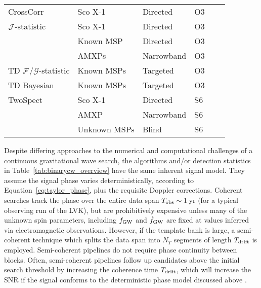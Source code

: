 \begin{table}
{\begin{NiceTabular}{l p{2cm} l p{2cm} p{2.2cm} p{2.2cm}}
    CrossCorr       & Sco X-1 & Directed & O3 & \citep{Dhurandhar2008,Whelan2015} & \citep{o3crosscorSco,Whelan2023}\\
    $\mathcal{J}$-statistic & Sco X-1 & Directed & O3 & \citep{Suvorova2017} & \citep{o3vitsco} \\
                    & Known MSP & Directed & O3 & \citep{Suvorova2017} & \citep{Vargas2023} \\
                    & AMXPs & Narrowband & O3 & \citep{Suvorova2017} & \citep{o3amxp} \\
    TD $\mathcal{F}$/$\mathcal{G}$-statistic & Known MSPs & Targeted & O3 & \citep{JKS98,Jaranowski2010} & \citep{o3known} \\
    TD Bayesian     & Known MSPs & Targeted & O3 & \citep{Pitkin2017} & \citep{o3known} \\ 
    TwoSpect        & Sco X-1 & Directed & S6 & \citep{twoSpectInit} & \citep{s6twoSpectScoXTE} \\
                    & AMXP & Narrowband & S6 & \citep{twoSpectInit} & \citep{s6twoSpectScoXTE} \\
                    & Unknown MSPs & Blind & S6 & \citep{twoSpectInit} & \citep{s6twospectAllsky} \\
    \bottomrule
    \end{NiceTabular}
    }
\end{table}

Despite differing approaches to the numerical and computational challenges of a continuous gravitational wave search, the algorithms and/or detection statistics in Table~\ref{tab:binarycw_overview} have the same inherent signal model. They assume the signal phase varies deterministically, according to Equation~\eqref{eq:taylor_phase}, plus the requisite Doppler corrections. Coherent searches track the phase over the entire data span $T_{\rm obs} \sim 1\,$yr (for a typical observing run of the LVK), but are prohibitively expensive unless many of the unknown spin parameters, including $f_{\rm GW}$ and $\dot{f}_{\rm GW}$ are fixed at values inferred via electromagnetic observations.  However, if the template bank is large, a semi-coherent technique which splits the data span into $N_T$ segments of length $T_{\rm drift}$ is employed. Semi-coherent pipelines do not require phase continuity between blocks. Often, semi-coherent pipelines follow up candidates above the initial search threshold by increasing the coherence time $T_{\rm drift}$, which will increase the SNR if the signal conforms to the deterministic phase model discussed above \citep{Whelan2015,Keitel:2021xeq}. 

